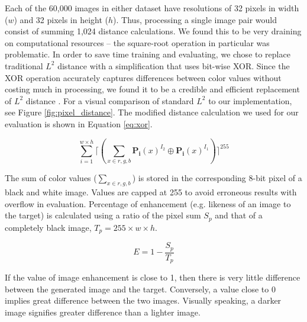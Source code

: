 \documentclass[letterpaper]{article} %
\begin{document}
Each of the 60,000 images in either dataset have resolutions of
32 pixels in width ($w$) and 32 pixels in height ($h$).
Thus, processing a single image pair would consist of summing 1,024
distance calculations.
We found this to be very draining on computational resources --
the square-root operation in particular was problematic.
In order to save time training and evaluating, we chose to replace
traditional $L^2$ distance with a simplification that uses bit-wise XOR.
Since the XOR operation accurately captures differences between color
values without costing much in processing,
we found it to be a credible and efficient replacement of $L^2$ distance
\cite{image_analysis}.
For a visual comparison of standard $L^2$ to our implementation,
see Figure \ref{fig:pixel_distance}.
The modified distance calculation we used for our evaluation is shown in Equation \ref{eq:xor}.

\begin{equation}
\label{eq:xor}
\sum_{i=1}^{w \times h}\lceil(\sum_{x \in r,g,b}\mathbf{P_i}(x)^{I_2} \oplus \mathbf{P_i}(x)^{I_1})\rceil^{255}
\end{equation}

The sum of color values ($\sum_{x \in r,g,b}$) is stored in
the corresponding 8-bit pixel of a black and white image.
Values are capped at 255 to avoid erroneous results with overflow in evaluation.
Percentage of enhancement (e.g. likeness of an image to the target)
is calculated using a ratio of the pixel sum $S_p$
and that of a completely black image, $T_p = 255 \times w \times h$.

\begin{equation}
\label{eq:enhancement}
E = 1 - \frac{S_p}{T_p}
\end{equation}

If the value of image enhancement
is close to 1, then there is very little difference between the generated
image and the target.
Conversely, a value close to 0 implies great difference between the two images.
Visually speaking, a darker image signifies greater difference than a lighter image.
\end{document}
